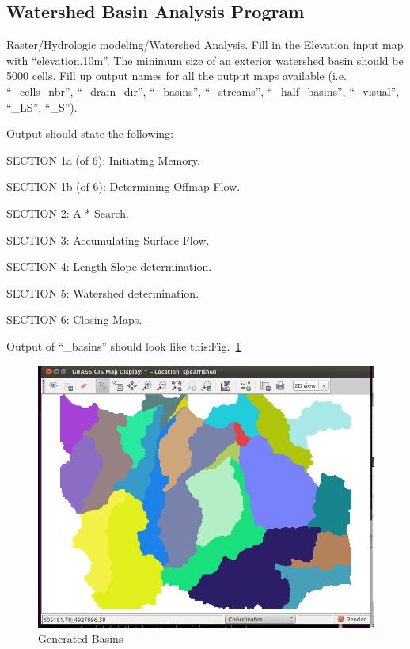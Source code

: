 \subsection{Watershed Basin Analysis Program}
Raster/Hydrologic modeling/Watershed Analysis.
Fill in the Elevation input map with ``elevation.10m''. The minimum size of an exterior watershed basin should be 5000 cells. Fill up output names for all the output maps available (i.e. ``\_cells\_nbr'', ``\_drain\_dir'', ``\_basins'', ``\_streams'', ``\_half\_basins'', ``\_visual'', ``\_LS'', ``\_S'').

Output should state the following:

SECTION 1a (of 6): Initiating Memory.

SECTION 1b (of 6): Determining Offmap Flow.

SECTION 2: A * Search.

SECTION 3: Accumulating Surface Flow.

SECTION 4: Length Slope determination.

SECTION 5: Watershed determination.

SECTION 6: Closing Maps.

Output of ``\_basins'' should look like this:Fig.~\ref{fig:grass012}

\begin{figure}[htbp]
   \centering
   \includegraphics[scale=0.35]{grass012.png}
   \caption{Generated Basins}
   \label{fig:grass012}
\end{figure}


